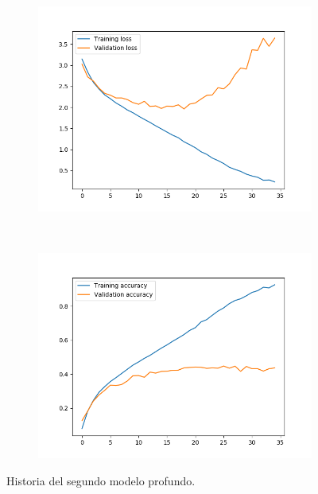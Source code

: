 \documentclass[11pt,a4paper]{article}
\begin{document}
\begin{figure}[H]
  \centering
  \begin{subfigure}{.5\textwidth}
    \centering
    \includegraphics[scale=0.4]{img/deep2-nodrop-loss.png}
    \label{fig:deep2-nodrop-loss}
  \end{subfigure}%
  ~ \quad
  \begin{subfigure}{.5\textwidth}
    \centering
    \includegraphics[scale=0.4]{img/deep2-nodrop-acc.png}
    \label{fig:deep2-nodrop-acc}
  \end{subfigure}
  \caption{Historia del segundo modelo profundo.}
  \label{fig:history-deep2-nodrop}
\end{figure}
\end{document}
